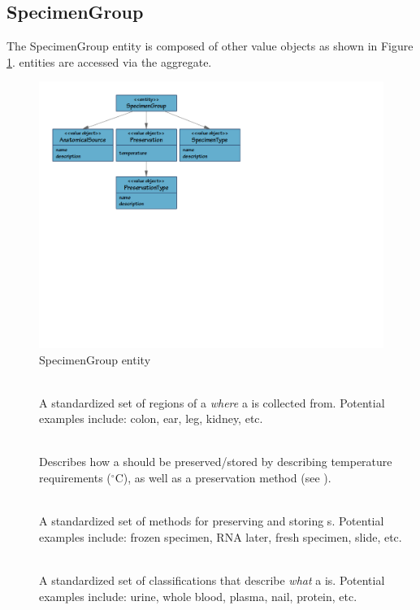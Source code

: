 \subsection{SpecimenGroup}
\label{sec:specimen-group}

The SpecimenGroup entity is composed of other value objects as shown in Figure
\ref{fig:specimen-group}.  entities are accessed
via the  aggregate.

\begin{figure}[h]
  \centering
  \includegraphics[trim={9mm 110mm 80mm 9mm}, clip,
    width=1\textwidth]{images/specimen-group}
  \caption{SpecimenGroup entity}
  \label{fig:specimen-group}
\end{figure}

\begin{description}

  \item[] \hfill \\ A standardized set of
    regions of a  \emph{where} a 
    is collected from. Potential examples include: colon, ear, leg, kidney,
    etc.

  \item[] \hfill \\ Describes how a
     should be preserved/stored by describing temperature
    requirements ($^\circ$C), as well as a preservation method (see
    ).

  \item[] \hfill \\ A standardized set of
    methods for preserving and storing s.  Potential
    examples include: frozen specimen, RNA later, fresh specimen, slide, etc.

  \item[] \hfill \\ A standardized set of
    classifications that describe \emph{what} a 
    is. Potential examples include: urine, whole blood, plasma, nail, protein,
    etc.

\end{description}

